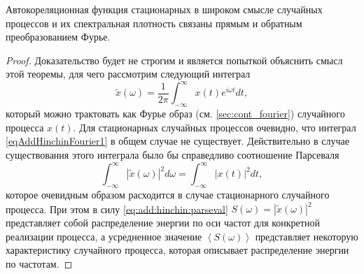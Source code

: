 \begin{theorem}
\label{thm:khinchin_wiener}
Автокореляционная функция стационарных в широком смысле случайных процессов
и их спектральная плотность связаны прямым и обратным
преобразованием Фурье.

\begin{proof}
Доказательство будет не строгим и является попыткой объяснить смысл
этой теоремы, для чего рассмотрим следующий интеграл
\begin{equation}
\tilde{x}\left(\omega\right) = \frac{1}{2 \pi}
\int_{-\infty}^{\infty}x\left(t\right)e^{i \omega t}dt,
\label{eqAddHinchinFourier1}
\end{equation}
который можно трактовать как Фурье образ (см. \autoref{sec:cont_fourier})
случайного процесса
$x\left(t\right)$. Для стационарных случайных процессов очевидно, что
интеграл \eqref{eqAddHinchinFourier1} в общем случае не существует.
Действительно в случае существования этого интеграла было бы
справедливо соотношение Парсеваля
\begin{equation}
\int_{-\infty}^\infty \left|\tilde{x}\left(\omega\right)\right|^2 d
\omega = \int_{-\infty}^\infty \left|x\left(t\right)\right|^2 dt,
\label{eq:add:hinchin:parseval}
\end{equation}
которое очевидным образом расходится в случае стационарного случайного
процесса. При этом в силу \eqref{eq:add:hinchin:parseval} 
$S\left(\omega\right) =\left|\tilde{x}\left(\omega\right)\right|^2$ представляет собой
распределение энергии по оси частот для конкретной реализации
процесса, а усредненное значение 
$\left<S\left(\omega\right)\right>$ представляет некоторую
характеристику случайного процесса, которая описывает распределение
энергии по частотам.


\end{proof}
\end{theorem}
